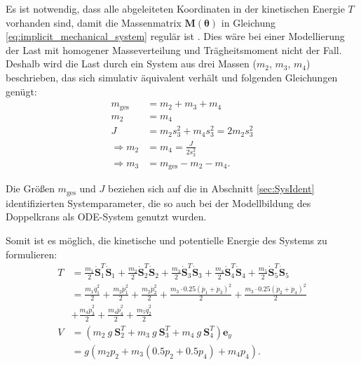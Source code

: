 Es ist notwendig, dass alle abgeleiteten Koordinaten in der kinetischen Energie $T$ vorhanden sind, damit die Massenmatrix $\mathbf{M}(\boldsymbol{\theta})$ in Gleichung \eqref{eq:implicit_mechanical_system} regulär ist \cite[S. 7]{DissKnoll}. Dies wäre bei einer Modellierung der Last mit homogener Masseverteilung und Trägheitsmoment nicht der Fall. Deshalb wird die Last durch ein System aus drei Massen ($m_2$, $m_3$, $m_4$) beschrieben, das sich simulativ äquivalent verhält und folgenden Gleichungen genügt:
\begin{align}
	m_{\mathrm{ges}} &= m_2 + m_3 + m_4\\
	m_2 &= m_4\\
	J &= m_2 s_3^2 + m_4 s_3^2 = 2 m_2 s_3^2\\
	\Rightarrow m_2 &= m_4 = \frac{J}{2 s_3^2} \\
	\Rightarrow m_3 &= m_{\mathrm{ges}} - m_2 -m_4.
\end{align}

Die Größen $m_{\mathrm{ges}}$ und $J$ beziehen sich auf die in Abschnitt \ref{sec:SysIdent} identifizierten Systemparameter, die so auch bei der Modellbildung des Doppelkrans als ODE-System genutzt wurden.

Somit ist es möglich, die kinetische und potentielle Energie des Systems zu formulieren:
\begin{align}
	T &= \frac{m_1}{2} \dot{\mathbf{S}}_1^T \dot{\mathbf{S}}_1 + \frac{m_2}{2} \dot{\mathbf{S}}_2^T \dot{\mathbf{S}}_2 + \frac{m_3}{2} \dot{\mathbf{S}}_3^T \dot{\mathbf{S}}_3 + \frac{m_4}{2} \dot{\mathbf{S}}_4^T \dot{\mathbf{S}}_4 + \frac{m_5}{2} \dot{\mathbf{S}}_5^T \dot{\mathbf{S}}_5 \nonumber \\  
	&= \frac{m_{1} \dot{q}_{1}^{2}}{2} + \frac{m_{2} \dot{p}_{1}^{2}}{2} + \frac{m_{2} \dot{p}_{2}^{2}}{2} + \frac{m_{3} \cdot 0.25 \left(\dot{p}_{1} + \dot{p}_{3}\right)^{2}}{2} + \frac{m_{3} \cdot 0.25 \left(\dot{p}_{2} + \dot{p}_{4}\right)^{2}}{2} \nonumber \\
	&+ \frac{m_{4} \dot{p}_{3}^{2}}{2} + \frac{m_{4} \dot{p}_{4}^{2}}{2} + \frac{m_{5} \dot{q}_{2}^{2}}{2} \\
	V &= (m_2 \ g \ \mathbf{S}_2^T + m_3 \ g \ \mathbf{S}_3^T + m_4 \ g \ \mathbf{S}_4^T) \mathbf{e}_y \nonumber \\ &= g \left(m_{2} p_{2} + m_{3} \left(0.5 p_{2} + 0.5 p_{4}\right) + m_{4} p_{4}\right).
\end{align}

